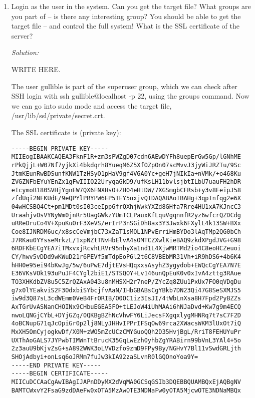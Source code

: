 \documentclass[a4paper,11pt]{article}
\newenvironment{solution}%
{\par{\noindent\small\textit{Solution:}}\vspace{-12pt}\begin{framed}}%
{\end{framed}\par}
\begin{document}
\begin{enumerate}
	\item Login as the user in the system. Can you get the target file? What groups are you part of -- is there any interesting group? You should be able to get the target file -- and control the full system! What is the SSL certificate of the server?
	
	\ifsolution\begin{solution}
WRITE HERE.

The user gullible is part of the superuser group, which we can check after SSH login with ssh gullible@localhost -p 22, using the groups command. Now we can go into sudo mode and access the target file, /usr/lib/ssl/private/secret.crt.

The SSL certificate is (private key):
\begin{verbatim}
-----BEGIN PRIVATE KEY-----
MIIEogIBAAKCAQEA3FknF1R+zm3sPWZgD07cdn6AEwDYFh8uepErGw5Gp/lGNhME
rPkQjjL+W07Nf7yjkXi4bkdqrh8YueqM6Z5XfOZpOn07scMvvJ3jyWiJRZTu/9Sc
JtmKEunRwBDSunfKNW1TzHSyO1pHaV9gf4V6A0Yc+geH7jNIkIa+nVMk/+o468Ku
ZVGZNFbEYuYEnZx1gFwIIIQ22UryqaGkD9/ufKsLH11bvlsjbtILbU7uauFH2hDR
eIcymoB180SVHjYgnEW7QX6FNXHsO+ZH04eHtDW/7XGSmgbCFRsb+y3v8FeipJ58
zfdUqi2NFKUdE/9eQPYlPRYPW6EP5TEY5nxjvQIDAQABAoIBAHg+3qpInfqg2e6X
04wHCSBQ4Ct+pm1MDt0sI03ceIpp6frQXhjWwkYXZd8GHfa7Rre4HU1xA7KJncC3
UraahjvOsVYNyWm0jnRr5UagGWkzYUmTCLPauxKfLquVgqnnfR2yz6wfcrQZDCdg
uRReDruCo4V+XpuKuOrF3XeVS/erIrP3nSGiDh8ax3Y3Jwxk6FXylL4k13SW+BXx
Coe8IJNRDM6uc/x8scCeVmjbC73xZaT1sMOL1NPvErriHmBYDo3lAqTMp2QG0bCh
J7RKau0YYsseMrkzL/1xpNZtTNvHbElvA4sOMTCZXwlKieBAQ9zkdXPgdJVG+G98
6RDFKbECgYEA7iTMxvxjRcvhLRVr95nbyXa1nd1L4XjwMRTMd2io4C8eoHCZeuoi
CY/hwv5vDDd9wKWuD21r6PEVf5mTdpEoP6l2t6C8VBEbMR31Vh+iR9hDS6+4b6K4
hHH0e95ei94bKwJg/5w/6uPwE7djtEVsHQqxxsAsyhZ3ygydob+EWQcCgYEA7N7E
E36VKsVOk193uPuJF4CYgl2biE1/STSQOY+Lv146unQpEuK0v0xIvA4zttg3RAue
TO3XHKdbZV8u5C5ZrQZAxA043u8nMHSXH2r7neP/ZYcZq8ZUu1PxUx7FO0qVDgDu
g7x0lYEakviS2F3OdxbiSYbcjfvAaN/IHbGBABsCgYBkb7DN23Qi47G8SeSXMJS5
iw9d3Q87sL3cdWEmm0VeB4FrORIB/O0OC1iz3IsJI/4tWbLnXsa8H7Fpd2PyBZZs
AxTGrUvASNanCHOINx9CHbuEGEA5FO+tLEJoW4iUhMAAi6hNJaDvd+Kw7g9m4ECQ
nwoLQNGjCYbL+DYjGZq/0QKBgBZhNcVhwFY6LiJecsFXgqxlygMHNRq7t7sC7F2D
4oBCNupG71qJcOpiGr0p2lj8NLyJHHvIPPrIFSqOw69rca2XWacsWKM3lUxOt7iQ
MxXH5OmCyjogkwDf/X0M+zWO5mZcUCzCMYGuoQQh2D35HvjBgL/RriT8FEHUYuPr
UXThAoGALS7JYPwbTIMWnTtBrucK35GqLwEzh0yhbZgYRABirn99bVnL3YAl4+5o
2z3auU9bKjvZsG+sA892WWK3oLVVDzfo9zmD9FPy9By/NGHvY7Bl11vSwdGRLjth
SHOjAdbyi+onLsq6oJRMm7fuJw3kIA92zaSLvnR0lGQOnoYoa9Y=
-----END PRIVATE KEY-----
-----BEGIN CERTIFICATE-----
MIICuDCCAaCgAwIBAgIJAPnDDyMX2dVqMA0GCSqGSIb3DQEBBQUAMBQxEjAQBgNV
BAMTCWxvY2FsaG9zdDAeFw0xOTA5MzAwOTE3NDNaFw0yOTA5MjcwOTE3NDNaMBQx

\end{verbatim}
\end{solution}
\end{enumerate}
\end{document}
